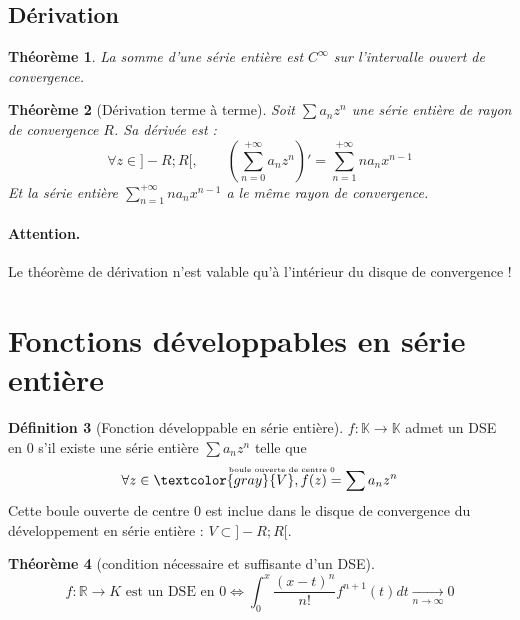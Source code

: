 \documentclass[11pt,a4paper]{report}
\newtheorem{theorem}{Théorème}[chapter]
\newtheorem{itheorem}[theorem]{Théorème}
\theoremstyle{definition}
\newtheorem{dfn}[theorem]{Définition}
\begin{document}
\subsection{Dérivation} %
\label{sub:derivation_DSE}
\begin{theorem}
     La somme d'une série entière est $C^\infty$ sur l'intervalle ouvert de convergence.
\end{theorem}
\begin{itheorem}[Dérivation terme à terme]

     Soit $\sum a_n z^n$ une série entière de rayon de convergence $R$. Sa dérivée est :
     \begin{equation}
     \forall z\in ]-R;R[,\qquad \left( \sum_{n=0}^{+\infty} a_n z^n \right)' = \sum_{n=1}^{+\infty} n a_n x^{n-1} 
     \end{equation}
     Et la série entière $\sum_{n=1}^{+\infty} n a_n x^{n-1}$ a le même rayon de convergence.
\end{itheorem}
\paragraph{Attention.} Le théorème de dérivation n'est valable qu'à l'intérieur du disque de convergence !


\section{Fonctions développables en série entière} %
\label{sec:fonctions_DSE}
\begin{dfn}[Fonction développable en série entière]
$f:\mathbb{K}\to\mathbb{K}$ admet un DSE en $0$ s'il existe une série entière $\sum a_n z^n$ telle que
\begin{equation}
\forall z \in \textcolor{gray}{\overset{\mathclap{\text{\begin{tiny}
boule ouverte de centre 0
\end{tiny}}}}{V}}, f(z) = \sum a_n z^{n}
\end{equation}
Cette boule ouverte de centre $0$ est inclue dans le disque de convergence du développement en série entière : $V \subset ]-R ; R[$.
\end{dfn}

\begin{theorem}[condition nécessaire et suffisante d'un DSE] %

\[
f:\ensuremath{\mathbb{R}}\rightarrow K\text{ est un DSE en 0}\Leftrightarrow \boxed{\displaystyle \int_0^x \dfrac{(x-t)^n}{n!}f^{n+1}(t) dt \underset{n\to\infty}{\to}0}
\]

\end{theorem}
\end{document}
